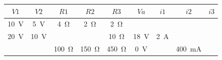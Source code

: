 \documentclass{article}
\begin{document}
\begin{enumerate}[label=\textbf{A.\arabic*}]
\begin{tabular}{|c|c|c|c|c|c|c|c|c|}
	\hline
	\rowcolor{headergray}
	${V1}$&$ {V2}$&${R1} $&${R2} $&$ {R3} $&${Va} $&$ {{i}1}$ &$ {{i}2}$ &$ {{i}3}$\\ \hline
	\SI{10}{\volt}&\SI{5}{\volt}&\SI{4}{\ohm}&\SI{2}{\ohm}&\SI{2}{\ohm}&&&& \\ \hline
	\SI{20}{\volt}&\SI{10}{\volt}&&&\SI{10}{\ohm}&\SI{18}{\volt}&\SI{2}{\ampere}&& \\ \hline
	&&\SI{100}{\ohm}&\SI{150}{\ohm}&\SI{450}{\ohm}&\SI{0}{\volt}&&\SI{400}{\milli\ampere}& \\ \hline
	
	
\end{tabular}

\begin{minipage}{.45\textwidth}
	

\end{minipage}
\end{enumerate}
\end{document}
